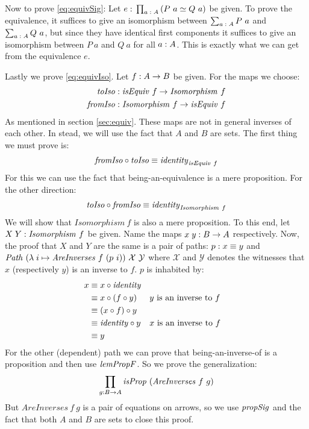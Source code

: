 Now to prove \ref{eq:equivSig}: Let $e \;\mathord{:}\; \prod_{a \;\mathord{:}\; A} \left( P\ a \simeq
Q\ a \right)$ be given. To prove the equivalence, it suffices to give an
isomorphism between $\sum_{a \tp A} P\ a$ and $\sum_{a \;\mathord{:}\; A} Q\ a$, but since
they have identical first components it suffices to give an isomorphism between
$P\ a$ and $Q\ a$ for all $a \;\mathord{:}\; A$. This is exactly what we can get from
the equivalence $e$.\QED

Lastly we prove \ref{eq:equivIso}. Let $f \;\mathord{:}\; A \to B$ be given. For the maps we
choose:
%
\begin{align*}
\mathit{toIso}
  & \;\mathord{:}\; \mathit{isEquiv}\ f             \to \mathit{Isomorphism}\ f \\
\mathit{fromIso}
  & \;\mathord{:}\; \mathit{Isomorphism}\ f \to \mathit{isEquiv}\ f
\end{align*}
%
As mentioned in section \ref{sec:equiv}. These maps are not in general inverses
of each other. In stead, we will use the fact that $A$ and $B$ are sets. The first thing we must prove is:
%
\begin{align*}
  \mathit{fromIso} \circ \mathit{toIso} \equiv \mathit{identity}_{\mathit{isEquiv}\ f}
\end{align*}
%
For this we can use the fact that being-an-equivalence is a mere proposition.
For the other direction:
%
\begin{align*}
  \mathit{toIso} \circ \mathit{fromIso} \equiv \mathit{identity}_{\mathit{Isomorphism}\ f}
\end{align*}
%
We will show that $\mathit{Isomorphism}\ f$ is also a mere proposition. To this
end, let $X\;Y \;\mathord{:}\; \mathit{Isomorphism}\ f$ be given. Name the maps $x\;y \;\mathord{:}\; B
\to A$ respectively. Now, the proof that $X$ and $Y$ are the same is a pair of
paths: $p \;\mathord{:}\; x \equiv y$ and $\mathit{Path}\ (\lambda\; i \mapsto
\mathit{AreInverses}\ f\ (p\ i))\ \mathcal{X}\ \mathcal{Y}$ where $\mathcal{X}$
and $\mathcal{Y}$ denotes the witnesses that $x$ (respectively $y$) is an
inverse to $f$. $p$ is inhabited by:
%
\begin{align*}
  x
  & \equiv x \circ \mathit{identity} \\
  & \equiv x \circ (f \circ y)
  && \text{$y$ is an inverse to $f$} \\
  & \equiv (x \circ f) \circ y \\
  & \equiv \mathit{identity} \circ y
  && \text{$x$ is an inverse to $f$} \\
  & \equiv y
\end{align*}
%
For the other (dependent) path we can prove that being-an-inverse-of is a
proposition and then use $\mathit{lemPropF}$. So we prove the generalization:
%
\begin{align*}
\prod_{g : B \to A} \mathit{isProp}\ (\mathit{AreInverses}\ f\ g)
\end{align*}
%
But $\mathit{AreInverses}\ f\ g$ is a pair of equations on arrows, so we use
$\mathit{propSig}$ and the fact that both $A$ and $B$ are sets to close this proof.

